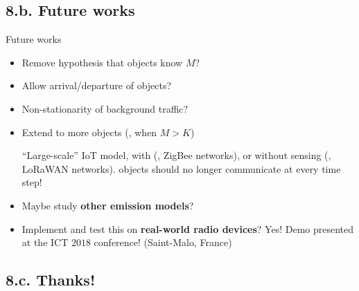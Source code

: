 \documentclass[12pt,english,ignorenonframetext,]{beamer}
\providecommand{\tightlist}{%
  \setlength{\itemsep}{0pt}\setlength{\parskip}{0pt}}
\begin{document}
\subsection{\hfill{}8.b. Future works\hfill{}}

\begin{frame}{Future works}

\begin{itemize}\tightlist
\item
  Remove hypothesis that objects know \(M\)?
\item
  Allow arrival/departure of objects?
\item
  Non-stationarity of background traffic?

  \pause

\item Extend to more objects (\ie, when \(M > K\))

``Large-scale'' IoT model,
with (\eg, ZigBee networks),
or without sensing (\eg, LoRaWAN networks).
\hook objects should no longer communicate at every time step!

\pause


\item
  Maybe study \textbf{other emission models}?
\item
  Implement and test this on \textbf{real-world radio devices}?
  \hook Yes! Demo presented at the ICT \(2018\) conference! (Saint-Malo, France)

\end{itemize}

\end{frame}


\subsection{\hfill{}8.c. Thanks!\hfill{}}
\end{document}
